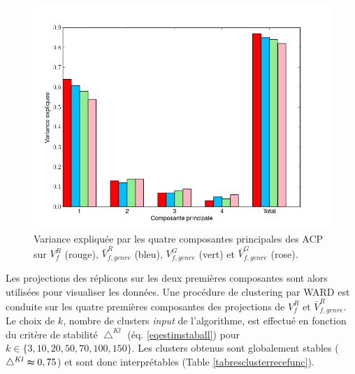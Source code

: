 \begin{figure}[H]
	\begin{center}
	\includegraphics[scale=0.5]{./img/PCA_variance.png}
	\caption[Variance expliquée par les quatre composantes principales]{Variance expliquée par les quatre composantes principales des ACP sur $V^{R}_{f}$ (rouge), $\bar{V}^{R}_{f,genre}$ (bleu), $V^{G}_{f,genre}$ (vert) et $\bar{V}^{G}_{f,genre}$ (rose).}\label{figpcavarianceexpl}
	\end{center}	
\end{figure}	
	
	Les projections des réplicons sur les deux premières composantes sont alors utilisées pour visualiser les données. Une procédure de clustering par WARD est conduite sur les quatre premières composantes des projections de $V^{R}_{f}$ et $\bar{V}^{R}_{f,genre}$. Le choix de $k$, nombre de clusters \textit{input} de l'algorithme, est effectué en fonction du critère de stabilité $\bigtriangleup^{Kl}$ (éq. \ref{eqestimstaball}) pour $k \in \{3,10,20,50,70,100,150\}$. Les clusters obtenus sont globalement stables ($\bigtriangleup^{Kl} \thickapprox 0,75$) et sont donc interprétables (Table \ref{tabresclusterrecefunc}). 

